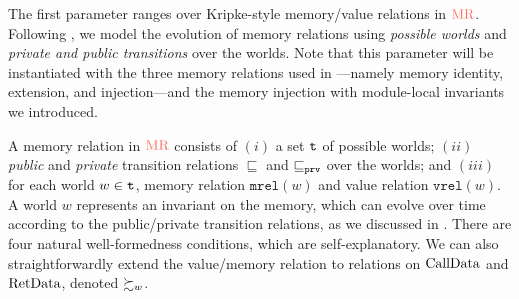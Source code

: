 


The first parameter ranges over Kripke-style memory/value relations in $\MREL$.
Following \cite{DBLP:conf/icfp/DreyerNB10,pb}, we model the
evolution of memory relations using \emph{possible worlds} and \emph{private and public transitions}
over the worlds.
Note that this parameter will be instantiated with the three memory relations used in \cc{}---namely memory
identity, extension, and injection---and the memory injection with module-local invariants we introduced.

A memory relation in $\MREL$ consists of $(i)$ a set $\texttt{t}$ of possible worlds; $(ii)$ \emph{public}
and \emph{private} transition relations $\sqsubseteq$ and $\sqsubseteq_{\texttt{prv}}$ over the worlds;
and $(iii)$ for each world $w \in \texttt{t}$, memory relation $\texttt{mrel}(w)$ and
value relation $\texttt{vrel}(w)$.  A world $w$ represents an invariant on the memory, which
can evolve over time according to the public/private transition relations,
as we discussed in .
There are four natural well-formedness conditions, which are self-explanatory.
We can also straightforwardly extend the value/memory relation to relations on $\textrm{CallData}$ and $\textrm{RetData}$, denoted $\succsim_{w}$.

